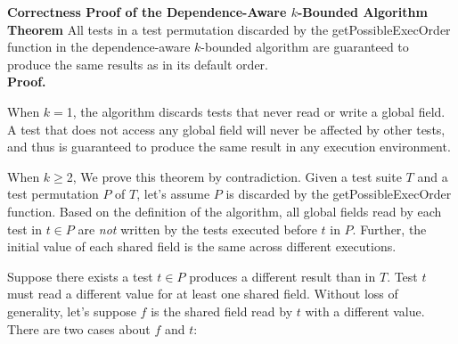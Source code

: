 \documentclass[12pt]{article}
\begin{document}


\noindent \textbf{Correctness Proof of the Dependence-Aware $k$-Bounded Algorithm}\\


\noindent \textbf{Theorem} All tests in a test permutation discarded by the getPossibleExecOrder
function in the dependence-aware $k$-bounded algorithm are guaranteed to produce the same results as in its default order.\\



\noindent \textbf{Proof.} 

When $k=$1, the algorithm discards tests that never read or write a global field. A test that does not access any global field will never be affected by other tests, and thus is guaranteed to produce the same result in any execution environment.

When $k\ge$2, We prove this theorem by contradiction. Given a test suite $T$ and a test permutation $P$ of $T$, let's assume  $P$ is discarded by the
getPossibleExecOrder function. Based on the definition of the algorithm,
all global fields read by each test in $t \in P$ are \textit{not} written by the tests
executed before $t$ in $P$. Further, the initial value of each shared field is the
same across different executions.


Suppose there exists a test $t \in P$ produces a different result than in $T$.
Test $t$ must read a different value for at least one shared field. Without loss
of generality, let's suppose $f$ is the shared field read by $t$ with a different
value. There are two cases about $f$ and $t$:
\end{document}
